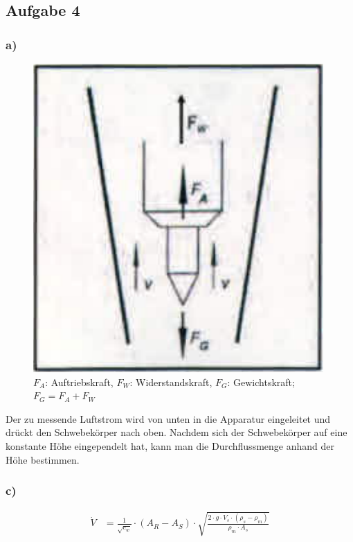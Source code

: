 \subsection{Aufgabe 4}

\subsubsection*{a)}

\begin{figure}[h]
\centering
\includegraphics[scale=0.6]{A2b.png}
\caption{$F_A$: Auftriebskraft, $F_W$: Widerstandskraft, $F_G$: Gewichtskraft; $F_G = F_A + F_W$}
\end{figure}

Der zu messende Luftstrom wird von unten in die Apparatur eingeleitet und drückt den Schwebekörper nach oben. Nachdem sich der Schwebekörper auf eine konstante Höhe eingependelt hat, kann man die Durchflussmenge anhand der Höhe bestimmen.

\subsubsection*{c)}

\begin{align*}
\dot{V} &= \frac{1}{\sqrt{c_w}} \cdot \left( A_R - A_S \right) \cdot \sqrt{\frac{2 \cdot g \cdot V_s \cdot \left( \rho_s - \rho_m \right)}{\rho_m \cdot A_s}}
\end{align*}

